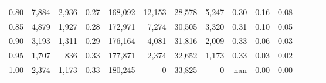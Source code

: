 \begin{tabular}{rrrrrrrrrrrrrr}
0.80 &   7,884 &  2,936 &  0.27 &  168,092 &   12,153 &  28,578 &   5,247 &  0.30 &  0.16 &      0.08 \\
0.85 &   4,879 &  1,927 &  0.28 &  172,971 &    7,274 &  30,505 &   3,320 &  0.31 &  0.10 &      0.05 \\
0.90 &   3,193 &  1,311 &  0.29 &  176,164 &    4,081 &  31,816 &   2,009 &  0.33 &  0.06 &      0.03 \\
0.95 &   1,707 &    836 &  0.33 &  177,871 &    2,374 &  32,652 &   1,173 &  0.33 &  0.03 &      0.02 \\
1.00 &   2,374 &  1,173 &  0.33 &  180,245 &        0 &  33,825 &       0 &   nan &  0.00 &      0.00 \\
\bottomrule
\end{tabular}
